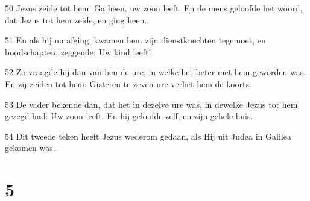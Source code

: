 \par 50 Jezus zeide tot hem: Ga heen, uw zoon leeft. En de mens geloofde het woord, dat Jezus tot hem zeide, en ging heen.
\par 51 En als hij nu afging, kwamen hem zijn dienstknechten tegemoet, en boodschapten, zeggende: Uw kind leeft!
\par 52 Zo vraagde hij dan van hen de ure, in welke het beter met hem geworden was. En zij zeiden tot hem: Gisteren te zeven ure verliet hem de koorts.
\par 53 De vader bekende dan, dat het in dezelve ure was, in dewelke Jezus tot hem gezegd had: Uw zoon leeft. En hij geloofde zelf, en zijn gehele huis.
\par 54 Dit tweede teken heeft Jezus wederom gedaan, als Hij uit Judea in Galilea gekomen was.

\chapter{5}

